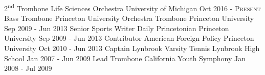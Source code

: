 \begin{cventries}
  \cventry
    {2\textsuperscript{nd} Trombone} %
    {Life Sciences Orchestra} %
    {University of Michigan} %
    {Oct 2016 - \textsc{Present}} %
    {}
\ifoutdated
  \cventry
    {Bass Trombone} %
    {Princeton University Orchestra Trombone} %
    {Princeton University} %
    {Sep 2009 - Jun 2013} %
    {}
  \cventry
    {Senior Sports Writer} %
    {Daily Princetonian} %
    {Princeton University} %
    {Sep 2009 - Jun 2013} %
    {}
  \cventry
    {Contributor} %
    {American Foreign Policy} %
    {Princeton University} %
    {Oct 2010 - Jun 2013} %
    {}
  \cventry
    {Captain} %
    {Lynbrook Varsity Tennis} %
    {Lynbrook High School} %
    {Jan 2007 - Jun 2009} %
    {}
  \cventry
    {Lead Trombone} %
    {California Youth Symphony} %
    {} %
    {Jan 2008 - Jul 2009} %
    {}
\fi
\end{cventries}
